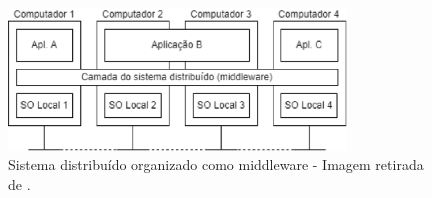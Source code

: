    \begin{figure}[h]
            \centering
            \includegraphics[width=0.8\textwidth]{figuras/sistema-distribuido.eps}
            \caption{Sistema distribuído organizado como middleware - Imagem retirada de \cite{}.}
            \label{fig:sistema-distribuido}
    \end{figure}



    